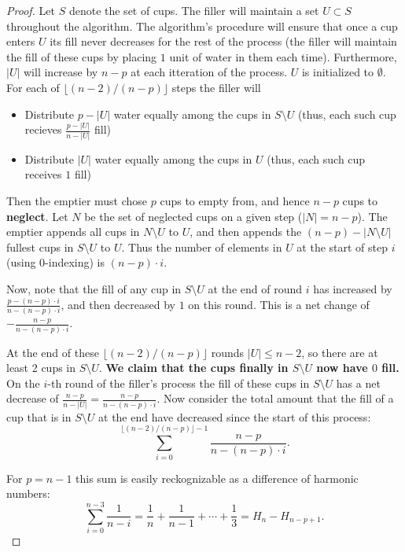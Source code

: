 \documentclass{article}[11pt]
\begin{document}
\begin{proof}
Let $S$ denote the set of cups. The filler will maintain a set $U \subset S$
throughout the algorithm. The algorithm's procedure will ensure that once a cup
enters $U$ its fill never decreases for the rest of the process (the filler will
maintain the fill of these cups by placing $1$ unit of water in them each time). 
Furthermore, $|U|$ will increase by $n-p$ at each itteration of the process.
$U$ is initialized to $\emptyset$. For each of $\lfloor(n-2) / (n-p)\rfloor$ steps the filler will
\begin{itemize}
  \item Distribute $p - |U|$ water equally among the cups in $S\setminus U$ (thus, each such cup recieves $\frac{p-|U|}{n-|U|}$ fill)
  \item Distribute $|U|$ water equally among the cups in $U$ (thus, each such cup receives $1$ fill)
\end{itemize}

Then the emptier must chose $p$ cups to empty from, and hence $n-p$ cups to \textbf{neglect}.
Let $N$ be the set of neglected cups on a given step ($|N| = n-p$).
The emptier appends all cups in $N \setminus U$ to $U$, and then appends the
$(n-p) - |N\setminus U |$ fullest cups in $S \setminus U$ to $U$.  Thus the
number of elements in $U$ at the start of step $i$ (using $0$-indexing) is 
$(n-p)\cdot i$.

Now, note that the fill of any cup in $S \setminus U$ at the end of round $i$
has increased by $\frac{p-(n-p)\cdot i}{n-(n-p)\cdot i}$, and then decreased by
$1$ on this round. This is a net change of $-\frac{n-p}{n-(n-p)\cdot i}$.

At the end of these $\lfloor (n-2) / (n-p) \rfloor$ rounds $|U| \le n-2$, so
there are at least 2 cups in $S \setminus U$.
\textbf{We claim that the cups finally in $S\setminus U$ now have $0$ fill.}
On the $i$-th round of the filler's process the fill of these cups in $S
\setminus U$ has a net decrease of $\frac{n-p}{n-|U|} = \frac{n-p}{n-(n-p)\cdot i}$. 
Now consider the total amount that the fill of a cup that is in $S\setminus U$ at the end
have decreased since the start of this process:
$$\sum_{i=0}^{\lfloor(n-2) / (n-p)\rfloor - 1} \frac{n-p}{n-(n-p)\cdot i}.$$

For $p = n-1$ this sum is easily reckognizable as a difference of harmonic
numbers: $$\sum_{i=0}^{n-3}\frac{1}{n-i} = \frac{1}{n} + \frac{1}{n-1} + \cdots
+ \frac{1}{3} =  H_{n} - H_{n-p+1}.$$


\end{proof}
\end{document}
